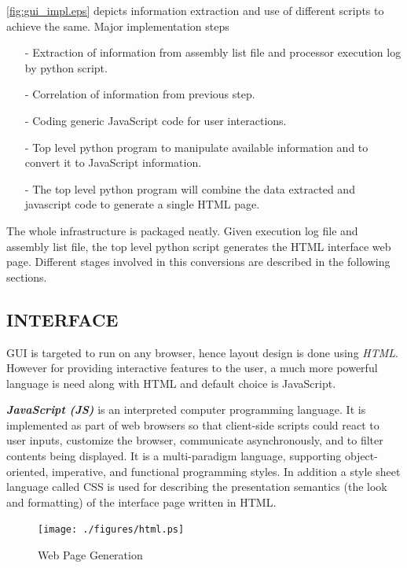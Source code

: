 \figurename{\ref{fig:gui_impl.eps}} depicts information extraction and use of different scripts to achieve the same. Major implementation steps
\begin{itemize}
\item[-] Extraction of information from assembly list file and processor execution log by python script.
\item[-] Correlation of information from previous step.
\item[-] Coding generic JavaScript code for user interactions.
\item[-] Top level python program to manipulate available information and to convert it to JavaScript information. 
\item[-] The top level python program will combine the data extracted and javascript code to generate a single HTML page. 
\end{itemize}

The whole infrastructure is packaged neatly. Given execution log file and assembly list file, the top level python script generates the HTML interface web page. Different stages involved in this conversions are described in the following sections. 

\subsection {INTERFACE}
GUI is targeted to run on any browser, hence layout design is done using {\it HTML}. However for providing interactive features to the user, a much more powerful language is need along with HTML and default choice is JavaScript.

\emph {\bf JavaScript (JS)} is an interpreted computer programming language. It is  implemented as part of web browsers so that client-side scripts could react to user inputs, customize the browser, communicate asynchronously, and to filter contents being displayed. It is a multi-paradigm language, supporting object-oriented, imperative, and functional programming styles.  
In addition a style sheet language called CSS is used for describing the presentation semantics (the look and formatting) of the interface page written in HTML.

\begin{figure}[h]
\centering
\texttt{[image: ./figures/html.ps]}
\caption{Web Page Generation}
\label{fig:impl:wpg}
\end{figure}

